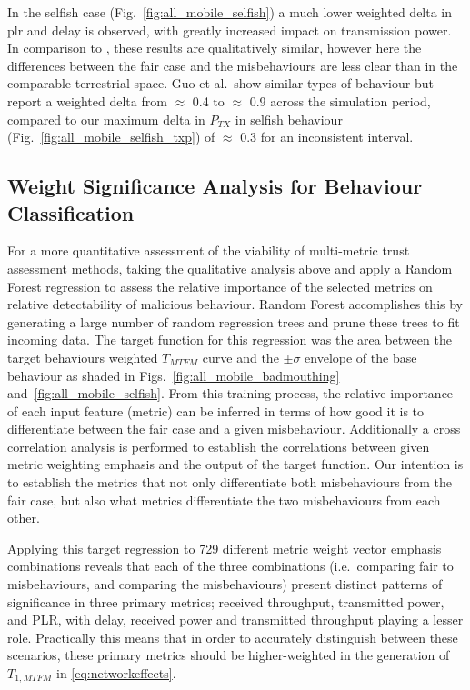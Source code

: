 In the selfish case (Fig.~\ref{fig:all_mobile_selfish}) a much lower weighted delta in \gls{plr} and delay is observed, with greatly increased impact on transmission power.
In comparison to \cite{Guo11}, these results are qualitatively similar, however here the differences between the fair case and the misbehaviours are less clear than in the comparable terrestrial space.
Guo et al.\ show similar types of behaviour but report a weighted delta from $\approx$ 0.4 to $\approx$ 0.9 across the simulation period, compared to our maximum delta in $P_{TX}$ in selfish behaviour (Fig.~\ref{fig:all_mobile_selfish_txp}) of $\approx$ 0.3 for an inconsistent interval.

\subsection{Weight Significance Analysis for Behaviour Classification}

For a more quantitative assessment of the viability of multi-metric trust assessment methods, taking the qualitative analysis above and apply a Random Forest regression \cite{Breiman2001} to assess the relative importance of the selected metrics on relative detectability of malicious behaviour. 
Random Forest accomplishes this by generating a large number of random regression trees and prune these trees to fit incoming data.
The target function for this regression was the area between the target behaviours weighted $T_{MTFM}$ curve and the $\pm\sigma$ envelope of the base behaviour as shaded in Figs.~\ref{fig:all_mobile_badmouthing} and~\ref{fig:all_mobile_selfish}.
From this training process, the relative importance of each input feature (metric) can be inferred in terms of how good it is to differentiate between the fair case and a given misbehaviour.
Additionally a cross correlation analysis is performed to establish the correlations between given metric weighting emphasis and the output of the target function.
Our intention is to establish the metrics that not only differentiate both misbehaviours from the fair case, but also what metrics differentiate the two misbehaviours from each other.

Applying this target regression to 729 different metric weight vector emphasis combinations reveals that each of the three combinations (i.e.\ comparing fair to misbehaviours, and comparing the misbehaviours) present distinct patterns of significance in three primary metrics; received throughput, transmitted power, and PLR, with delay, received power and transmitted throughput playing a lesser role.
Practically this means that in order to accurately distinguish between these scenarios, these primary metrics should be higher-weighted in the generation of $T_{1,MTFM}$ in \eqref{eq:networkeffects}.

